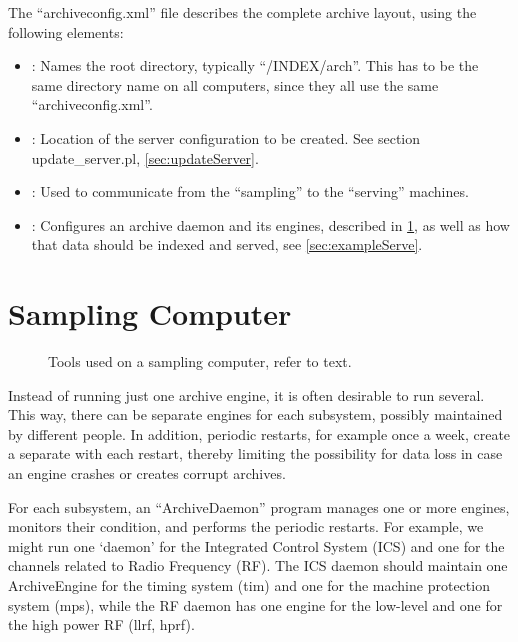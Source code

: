 

\noindent The ``archiveconfig.xml'' file describes the complete archive layout,
using the following elements:
\begin{itemize}
\item {}: Names the root directory, typically ``/INDEX{/arch}''.
      This has to be the same directory name on all computers,
      since they all use the same ``archiveconfig.xml''.
\item {}: Location of the server configuration to be
      created. See section update\_server.pl, \ref{sec:updateServer}.
\item {}: Used to communicate from the ``sampling'' to the
      ``serving'' machines.
\item {}: Configures an archive daemon and its engines,
      described in \ref{sec:exampleSample},
      as well as how that data should be indexed and served,
      see \ref{sec:exampleServe}.
\end{itemize}

\section{Sampling Computer} \label{sec:exampleSample}
\begin{figure}[htb]
\begin{center}
\end{center}
\caption{\label{fig:acSample}Tools used on a sampling computer, refer to text.}
\end{figure}

\noindent Instead of running just one archive engine, it is often desirable to
run several. This way, there can be separate engines for each
subsystem, possibly maintained by different people.  In addition,
periodic restarts, for example once a week, create a separate
 with each restart, thereby limiting the
possibility for data loss in case an engine crashes or creates corrupt
archives.

For each subsystem, an ``ArchiveDaemon'' program manages one or more
engines, monitors their condition, and performs the periodic restarts.
For example, we might run one `daemon' for the Integrated Control
System (ICS) and one for the channels related to Radio Frequency (RF).
The ICS daemon should maintain one ArchiveEngine for the timing system
(tim) and one for the machine protection system (mps), while the RF
daemon has one engine for the low-level and one for the high power RF
(llrf, hprf).


